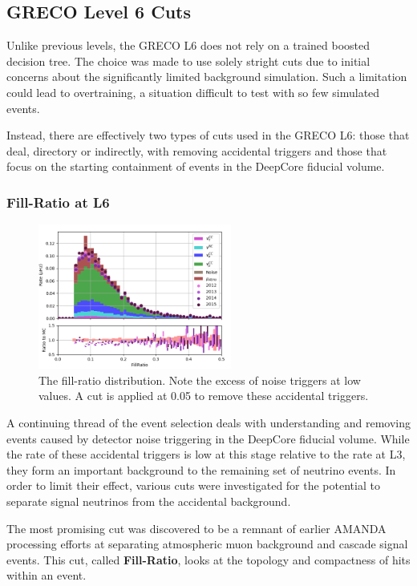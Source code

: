 \graphicspath{{chapters/greco/images/level6/}}

\subsection{GRECO Level 6 Cuts}
Unlike previous levels, the GRECO L6 does not rely on a trained boosted decision tree.
The choice was made to use solely stright cuts due to initial concerns about the significantly limited background simulation.
Such a limitation could lead to overtraining, a situation difficult to test with so few simulated events.

Instead, there are effectively two types of cuts used in the GRECO L6:
those that deal, directory or indirectly, with removing accidental triggers and those that focus on the starting containment of events in the DeepCore fiducial volume.

\subsubsection{Fill-Ratio at L6}
\begin{figure}[h]
	\centering
		\includegraphics[width=2.5in]{FillRatio.png}
		\caption[Fill-Ratio]{The fill-ratio distribution. Note the excess of noise triggers at low values. A cut is applied at 0.05 to remove these accidental triggers.}
	\label{fig:fill-ratio}
\end{figure}

A continuing thread of the event selection deals with understanding and removing events caused by detector noise triggering in the DeepCore fiducial volume.
While the rate of these accidental triggers is low at this stage relative to the rate at L3, they form an important background to the remaining set of neutrino events.
In order to limit their effect, various cuts were investigated for the potential to separate signal neutrinos from the accidental background.

The most promising cut was discovered to be a remnant of earlier AMANDA processing efforts at separating atmospheric muon background and cascade signal events.
This cut, called \textbf{Fill-Ratio}, looks at the topology and compactness of hits within an event.


